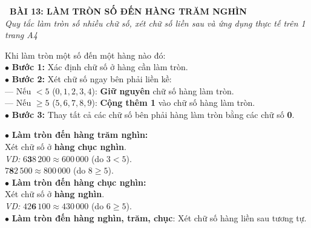 \documentclass[14pt,a4paper,oneside]{extbook}
\begin{document}
\noindent
\begin{tcolorbox}[
  enhanced,
  colback=teal!8!white,
  colframe=teal!80!black,
  arc=3mm, boxrule=1pt,
  left=3mm, right=3mm, top=2mm, bottom=2mm,
  halign=center
]
  {\Large\bfseries\color{teal!90!black}\faBookmark\ BÀI 13: LÀM TRÒN SỐ ĐẾN HÀNG TRĂM NGHÌN}\\[1.5pt]
  {\footnotesize\itshape\color{black!75} Quy tắc làm tròn số nhiều chữ số, xét chữ số liền sau và ứng dụng thực tế trên 1 trang A4}
\end{tcolorbox}

\vspace{2mm}

\noindent
\begin{minipage}[t]{0.49\textwidth}
  \begin{tcolorbox}[
    enhanced,
    title={\footnotesize\bfseries\color{white}\faFilter\ 1. Quy tắc làm tròn số},
    colback=blue!2!white,
    colframe=blue!75!black,
    arc=2.5mm, boxrule=0.8pt, top=1.8mm, bottom=1.8mm, left=2mm, right=2mm
  ]
    \footnotesize
    Khi làm tròn một số đến một hàng nào đó:\\
    $\bullet$ \textbf{Bước 1:} Xác định chữ số ở hàng cần làm tròn.\\
    $\bullet$ \textbf{Bước 2:} Xét chữ số ngay bên phải liền kề:\\
    --- Nếu $< 5$ ($0, 1, 2, 3, 4$): \textbf{Giữ nguyên} chữ số hàng làm tròn.\\
    --- Nếu $\ge 5$ ($5, 6, 7, 8, 9$): \textbf{Cộng thêm 1} vào chữ số hàng làm tròn.\\
    $\bullet$ \textbf{Bước 3:} Thay tất cả các chữ số bên phải hàng làm tròn bằng các chữ số \textbf{0}.
  \end{tcolorbox}
\end{minipage}%
\hfill
\begin{minipage}[t]{0.49\textwidth}
  \begin{tcolorbox}[
    enhanced,
    title={\footnotesize\bfseries\color{white}\faSliders\ 2. Các hàng làm tròn thường gặp},
    colback=teal!2!white,
    colframe=teal!75!black,
    arc=2.5mm, boxrule=0.8pt, top=1.8mm, bottom=1.8mm, left=2mm, right=2mm
  ]
    \footnotesize
    $\bullet$ \textbf{Làm tròn đến hàng trăm nghìn:}\\
    Xét chữ số ở \textbf{hàng chục nghìn}.\\
    \textit{VD:} $6\mathbf{3}8\,200 \approx 600\,000$ (do $3 < 5$).\\
    $7\mathbf{8}2\,500 \approx 800\,000$ (do $8 \ge 5$).\\[1mm]
    $\bullet$ \textbf{Làm tròn đến hàng chục nghìn:}\\
    Xét chữ số ở \textbf{hàng nghìn}.\\
    \textit{VD:} $42\mathbf{6}\,100 \approx 430\,000$ (do $6 \ge 5$).\\
    $\bullet$ \textbf{Làm tròn đến hàng nghìn, trăm, chục}: Xét chữ số hàng liền sau tương tự.
  \end{tcolorbox}
\end{minipage}
\end{document}
